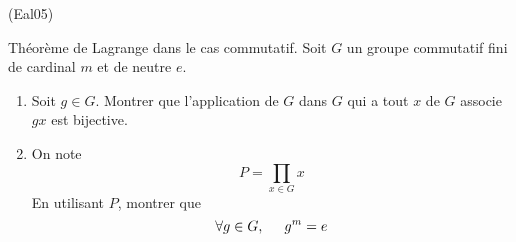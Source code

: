 \begin{tiny}(Eal05)\end{tiny} Théorème de Lagrange dans le cas commutatif.\newline
Soit $G$ un groupe commutatif fini de cardinal $m$ et de neutre $e$.
\begin{enumerate}
 \item Soit $g\in G$. Montrer que l'application de $G$ dans $G$ qui a tout $x$ de $G$ associe $gx$ est bijective.
 \item On note
\begin{displaymath}
 P = \prod_{x\in G}x
\end{displaymath}
En utilisant $P$, montrer que
\begin{displaymath}
 \forall g\in G,\hspace{0.5cm} g^m = e
\end{displaymath}
\end{enumerate}
